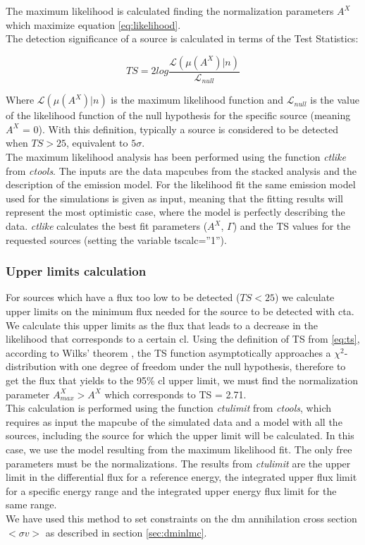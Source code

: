 \documentclass{article}
\begin{document}
The maximum likelihood is calculated finding the normalization parameters $A^{X}$ which maximize equation \ref{eq:likelihood}.\\
The detection significance of a source is calculated in terms of the Test Statistics:

\begin{equation}
  TS = 2log \frac{\mathcal{L}(\mu(A^{X})|n)}{\mathcal{L}_{null}}
  \label{eq:ts}
\end{equation}

Where $\mathcal{L}(\mu(A^{X})|n)$ is the maximum likelihood function and $\mathcal{L}_{null}$ is the value of the likelihood function of the null hypothesis for the specific source (meaning $A^X$ = 0). With this definition, typically a source is considered to be detected when $TS>25$, equivalent to $5\sigma$.\\
The maximum likelihood analysis has been performed using the function \textit{ctlike} from \textit{ctools}. The inputs are the data mapcubes from the stacked analysis and the description of the emission model. For the likelihood fit the same emission model used for the simulations is given as input, meaning that the fitting results will represent the most optimistic case, where the model is perfectly describing the data. \textit{ctlike} calculates the best fit parameters ($A^X$, $\Gamma$) and the TS values for the requested sources (setting the variable tscalc=''1'').

\subsubsection{Upper limits calculation} \label{sec:ulimits}

For sources which have a flux too low to be detected ($TS < 25$) we calculate upper limits on the minimum flux needed for the source to be detected with \gls{cta}. We calculate this upper limits as the flux that leads to a decrease in the likelihood that corresponds to a certain \gls{cl}. Using the definition of TS from \ref{eq:ts}, according to Wilks' theorem \cite{wilks1938}, the TS function asymptotically approaches a $\chi^2$-distribution with one degree of freedom under the null hypothesis, therefore to get the flux that yields to the 95\% \gls{cl} upper limit, we must find the normalization parameter $A^X_{max} > A^{X}$ which corresponds to TS = 2.71.\\
This calculation is performed using the function \textit{ctulimit} from \textit{ctools}, which requires as input the mapcube of the simulated data and a model with all the sources, including the source for which the upper limit will be calculated. In this case, we use the model resulting from the maximum likelihood fit. The only free parameters must be the normalizations. The results from \textit{ctulimit} are the upper limit in the differential flux for a reference energy, the integrated upper flux limit for a specific energy range and the integrated upper energy flux limit for the same range.\\
We have used this method to set constraints on the \gls{dm} annihilation cross section $<\sigma v>$ as described in section \ref{sec:dminlmc}.
    
\end{document}
